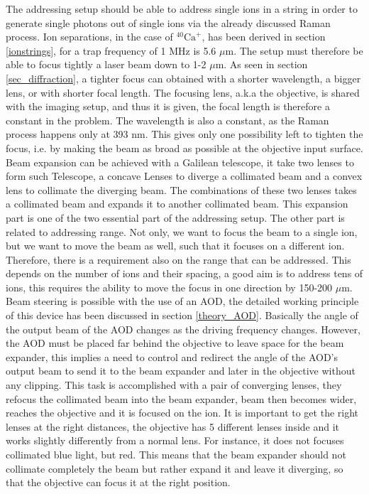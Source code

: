 The addressing setup should be able to address single ions in a string in order to generate single photons out of single ions via the already discussed Raman process. Ion separations, in the case of $^{40}\text{Ca}^+$, has been derived in section \ref{ionstrings}, for a trap frequency of 1 MHz is 5.6 $\mu$m. The setup must therefore be able to focus tightly a laser beam down to 1-2 $\mu$m. As seen in section \ref{sec_diffraction}, a tighter focus can obtained with a shorter wavelength, a bigger lens, or with shorter focal length. The focusing lens, a.k.a the objective, is shared with the imaging setup, and thus it is given, the focal length is therefore a constant in the problem. The wavelength is also a constant, as the Raman process happens only at 393 nm. This gives only one possibility left to tighten the focus, i.e. by making the beam as broad as possible at the objective input surface. Beam expansion can be achieved with a Galilean telescope, it take two lenses to form such Telescope, a concave Lenses to diverge a collimated beam and a convex lens to collimate the diverging beam. The combinations of these two lenses takes a collimated beam and expands it to another collimated beam. This expansion part is one of the two essential part of the addressing setup. The other part is related to addressing range. Not only, we want to focus the beam to a single ion, but we want to move the beam as well, such that it focuses on a different ion. Therefore, there is a requirement also on the range that can be addressed. This depends on the number of ions and their spacing, a good aim is to address tens of ions, this requires the ability to move the focus in one direction by 150-200 $\mu$m. Beam steering is possible with the use of an AOD, the detailed working principle of this device has been discussed in section \ref{theory_AOD}. Basically the angle of the output beam of the AOD changes as the driving frequency changes. However, the AOD must be placed far behind the objective to leave space for the beam expander, this implies a need to control and redirect the angle of the AOD's output beam to send it to the beam expander and later in the objective without any clipping. This task is accomplished with a pair of converging lenses, they refocus the collimated beam into the beam expander, beam then becomes wider, reaches the objective and it is focused on the ion. It is important to get the right lenses at the right distances, the objective has 5 different lenses inside and it works slightly differently from a normal lens. For instance, it does not focuses collimated blue light, but red. This means that the beam expander should not collimate completely the beam but rather expand it and leave it diverging, so that the objective can focus it at the right position.\\
